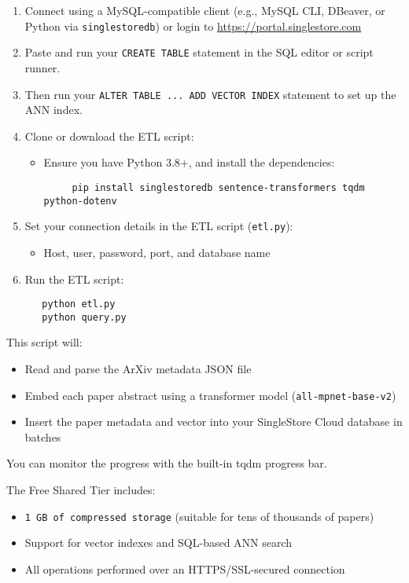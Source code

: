 \documentclass[11pt]{article}
\begin{document}
\begin{enumerate}
\item Connect using a MySQL-compatible client (e.g., MySQL CLI, DBeaver, or Python via \texttt{singlestoredb}) or login to \url{https://portal.singlestore.com}

\item Paste and run your \texttt{CREATE TABLE} statement in the SQL editor or script runner.

\item Then run your \texttt{ALTER TABLE ... ADD VECTOR INDEX} statement to set up the ANN index.

\item Clone or download the ETL script:
\begin{itemize}
\item Ensure you have Python 3.8+, and install the dependencies:
\begin{verbatim}
     pip install singlestoredb sentence-transformers tqdm python-dotenv
\end{verbatim}
\end{itemize}

\item Set your connection details in the ETL script (\texttt{etl.py}):
\begin{itemize}
\item Host, user, password, port, and database name
\end{itemize}

\item Run the ETL script:
\begin{verbatim}
   python etl.py
   python query.py
\end{verbatim}
\end{enumerate}

This script will:
\begin{itemize}
\item Read and parse the ArXiv metadata JSON file
\item Embed each paper abstract using a transformer model (\texttt{all-mpnet-base-v2})
\item Insert the paper metadata and vector into your SingleStore Cloud database in batches
\end{itemize}

You can monitor the progress with the built-in tqdm progress bar.

The Free Shared Tier includes:
\begin{itemize}
\item \texttt{1 GB of compressed storage} (suitable for tens of thousands of papers)
\item Support for vector indexes and SQL-based ANN search
\item All operations performed over an HTTPS/SSL-secured connection
\end{itemize}
\end{document}
